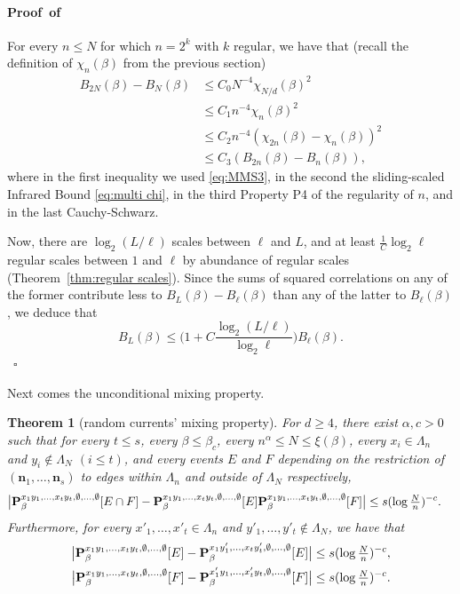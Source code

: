 \documentclass[a4paper,oneside,11pt]{article}
\newtheorem{theorem}{Theorem}[section]
\newcommand{\be}[1]{\begin{equation}\label{#1}}
\newcommand{\ee}{\end{equation}}
\numberwithin{equation}{section}
\numberwithin{equation}{section}
\numberwithin{equation}{section}
\newenvironment{proof}[1][\relax]%
  {\paragraph{Proof\ifx#1\relax\else~of #1\fi}}%
  {~\hfill$\square$\par\bigskip}
\def\be{\begin{equation}}
\def\ee{\end{equation}}
\newcommand{\n}{\mathbf{n}}
\begin{document}
\begin{proof}
For every $n\le N$ for which $n=2^k$ with $k$ regular, we have that (recall the definition of $\chi_n(\beta)$ from the previous section)
\begin{align}B_{2N}(\beta)-B_N(\beta)
&\le C_0N^{-4}\chi_{N/d}(\beta)^2\nonumber\\
&\le C_1n^{-4}\chi_n(\beta)^2\nonumber\\
&\le C_2n^{-4}(\chi_{2n}(\beta)-\chi_{n}(\beta))^2\nonumber\\
&\le C_3(B_{2n}(\beta)-B_n(\beta)),\end{align}
where in the first inequality we used \eqref{eq:MMS3}, in the second the sliding-scaled Infrared Bound \eqref{eq:multi chi}, in the third Property P4 of the regularity of $n$, and in the last Cauchy-Schwarz.

Now, there are $\log_2(L/\ell)$ scales  between $\ell$ and $L$, and at least $\tfrac1C\log_2 \ell$ regular scales between $1$ and $\ell$ by abundance of regular scales (Theorem~\ref{thm:regular scales}). Since the sums of squared correlations on any of the former contribute less to $B_L(\beta)-B_\ell(\beta)$ than any of the latter to $B_{\ell}(\beta)$, we deduce  that 
\be
B_L(\beta)\le \Big(1+C\frac{\log_2(L/\ell)}{\log_2\ell}\Big)B_\ell(\beta).
\ee
\end{proof}



Next comes the unconditional mixing property.
\begin{theorem}[random currents' mixing property]
\label{thm:mixing multi}
For $d\ge4$, there exist $\alpha,c>0$ such that for every $t\le s$, every $\beta\le \beta_c$, every $n^\alpha\le N\le\xi(\beta)$, every $x_i\in\Lambda_n$ and $y_i\notin\Lambda_N$ $(i\le t)$, and every events $E$ and $F$ depending on the restriction of $(\n_1,\dots,\n_s)$ to edges within $\Lambda_n$ and outside of $\Lambda_N$ respectively,  
\begin{align}\label{eq:mixing}\big|{\bf P}^{x_1y_1,\dots,x_ty_t,\emptyset,\dots,\emptyset}_\beta[E\cap F]-{\bf P}^{x_1y_1,\dots,x_ty_t,\emptyset,\dots,\emptyset}_\beta[E]{\bf P}^{x_1y_1,\dots,x_ty_t,\emptyset,\dots,\emptyset}_\beta[F]\big|&\le s(\log \tfrac Nn)^{-c}.\end{align}
 Furthermore, for every $x'_1,\dots,x'_t\in\Lambda_n$ and $y'_1,\dots,y'_t\notin\Lambda_N$, we have that 
\begin{align}\label{eq:independence}\big|{\bf P}^{x_1y_1,\dots,x_ty_t,\emptyset,\dots,\emptyset}_\beta[E]-{\bf P}^{x_1y_1',\dots,x_ty_t',\emptyset,\dots,\emptyset}_\beta[E]\big|&\le s(\log \tfrac Nn)^{-c},\\
\big|{\bf P}^{x_1y_1,\dots,x_ty_t,\emptyset,\dots,\emptyset}_\beta[F]-{\bf P}^{x_1'y_1,\dots,x_t'y_t,\emptyset,\dots,\emptyset}_\beta[F]\big|&\le s(\log \tfrac Nn)^{-c}\label{eq:independence2}.\end{align}
\end{theorem}
\end{document}
